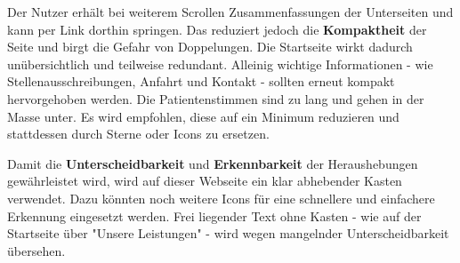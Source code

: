 Der Nutzer erhält bei weiterem Scrollen Zusammenfassungen der Unterseiten und kann per Link dorthin springen. Das reduziert jedoch die \textbf{Kompaktheit} der Seite und birgt die Gefahr von Doppelungen. Die Startseite wirkt dadurch unübersichtlich und teilweise redundant. Alleinig wichtige Informationen - wie Stellenausschreibungen, Anfahrt und Kontakt - sollten erneut kompakt hervorgehoben werden. Die Patientenstimmen sind zu lang und gehen in der Masse unter. Es wird empfohlen, diese auf ein Minimum reduzieren und stattdessen durch Sterne oder Icons zu ersetzen.

Damit die \textbf{Unterscheidbarkeit} und \textbf{Erkennbarkeit} der Heraushebungen gewährleistet wird, wird auf dieser Webseite ein klar abhebender Kasten verwendet. Dazu könnten noch weitere Icons für eine schnellere und einfachere Erkennung eingesetzt werden. Frei liegender Text ohne Kasten - wie auf der Startseite über "Unsere Leistungen" - wird wegen mangelnder Unterscheidbarkeit übersehen.
